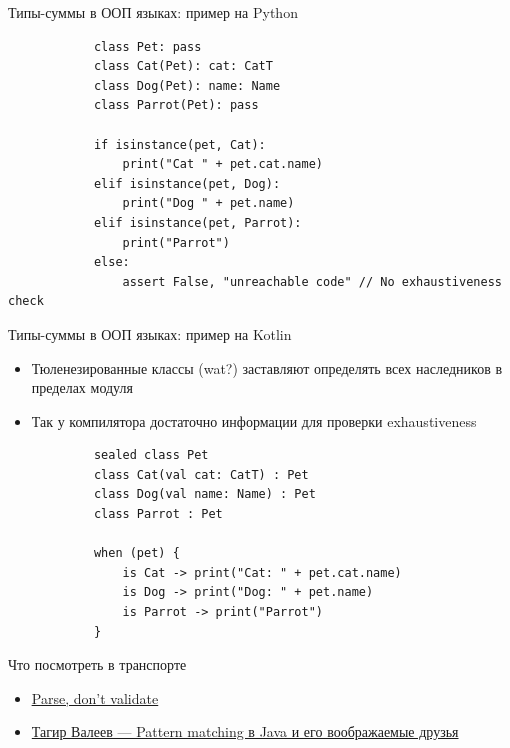     \begin{frame}[fragile]{Типы-суммы в ООП языках: пример на Python \popslide}
        \begin{verbatim}
            class Pet: pass
            class Cat(Pet): cat: CatT
            class Dog(Pet): name: Name
            class Parrot(Pet): pass

            if isinstance(pet, Cat):
                print("Cat " + pet.cat.name)
            elif isinstance(pet, Dog):
                print("Dog " + pet.name)
            elif isinstance(pet, Parrot):
                print("Parrot")
            else:
                assert False, "unreachable code" // No exhaustiveness check
        \end{verbatim}
    \end{frame}

    \begin{frame}[fragile]{Типы-суммы в ООП языках: пример на Kotlin \popslide}
        \begin{itemize}
            \item Тюленезированные классы (wat?) заставляют определять всех наследников в пределах модуля
            \item Так у компилятора достаточно информации для проверки exhaustiveness
        \end{itemize}
        \vspace{1em}
        \begin{verbatim}
            sealed class Pet
            class Cat(val cat: CatT) : Pet
            class Dog(val name: Name) : Pet
            class Parrot : Pet

            when (pet) {
                is Cat -> print("Cat: " + pet.cat.name)
                is Dog -> print("Dog: " + pet.name)
                is Parrot -> print("Parrot")
            }
        \end{verbatim}
    \end{frame}


    \begin{frame}{Что посмотреть в транспорте}
        \begin{itemize}
            \item \href{https://lexi-lambda.github.io/blog/2019/11/05/parse-don-t-validate/}{\color{blue} \underline{Parse, don’t validate}}
            \item \href{https://youtu.be/qurG_J81_Cs?si=tINacE3c6ZF3CkvF}{\color{blue} Тагир Валеев — Pattern matching в Java и его воображаемые друзья}
        \end{itemize}
    \end{frame}


